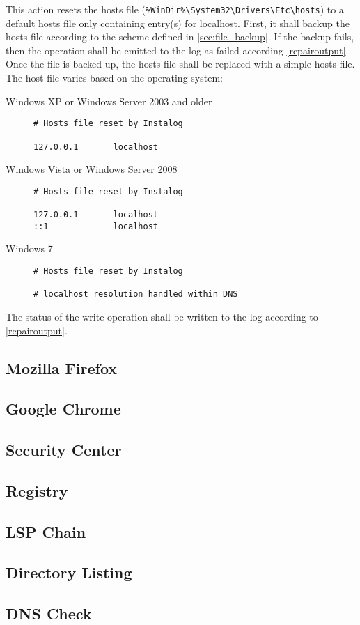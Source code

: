 This action resets the hosts file (\verb|%WinDir%\System32\Drivers\Etc\hosts|)
to a default hosts file only containing entry(s) for localhost.  First, it
shall backup the hosts file according to the scheme defined in
\ref{sec:file_backup}.  If the backup fails, then the operation shall be
emitted to the log as failed according \ref{repairoutput}.
Once the file is backed up, the hosts file shall be replaced with a simple
hosts file.  The host file varies based on the operating system:

\begin{description}
\item[Windows XP or Windows Server 2003 and older] \hfill 
\begin{verbatim}
# Hosts file reset by Instalog

127.0.0.1       localhost
\end{verbatim}
\item[Windows Vista or Windows Server 2008] \hfill 
\begin{verbatim}
# Hosts file reset by Instalog

127.0.0.1       localhost
::1             localhost
\end{verbatim}
\item[Windows 7] \hfill 
\begin{verbatim}
# Hosts file reset by Instalog

# localhost resolution handled within DNS
\end{verbatim}
\end{description}

The status of the write operation shall be written to the log according to
\ref{repairoutput}.  

\subsection{Mozilla Firefox}

\subsection{Google Chrome}

\subsection{Security Center}

\subsection{Registry}
\subsection{LSP Chain}

\subsection{Directory Listing}

\subsection{DNS Check}
